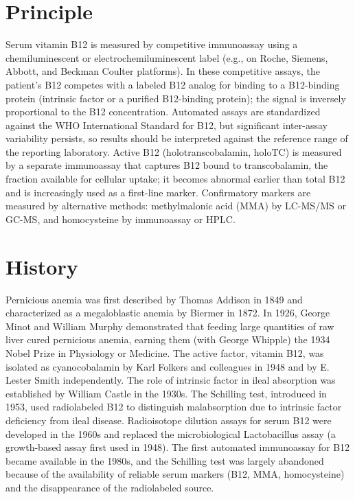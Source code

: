 \section*{Principle}
Serum vitamin B12 is measured by competitive immunoassay using a chemiluminescent or electrochemiluminescent label (e.g., on Roche, Siemens, Abbott, and Beckman Coulter platforms). In these competitive assays, the patient's B12 competes with a labeled B12 analog for binding to a B12-binding protein (intrinsic factor or a purified B12-binding protein); the signal is inversely proportional to the B12 concentration. Automated assays are standardized against the WHO International Standard for B12, but significant inter-assay variability persists, so results should be interpreted against the reference range of the reporting laboratory. Active B12 (holotranscobalamin, holoTC) is measured by a separate immunoassay that captures B12 bound to transcobalamin, the fraction available for cellular uptake; it becomes abnormal earlier than total B12 and is increasingly used as a first-line marker. Confirmatory markers are measured by alternative methods: methylmalonic acid (MMA) by LC-MS/MS or GC-MS, and homocysteine by immunoassay or HPLC.

\section*{History}
Pernicious anemia was first described by Thomas Addison in 1849 and characterized as a megaloblastic anemia by Biermer in 1872. In 1926, George Minot and William Murphy demonstrated that feeding large quantities of raw liver cured pernicious anemia, earning them (with George Whipple) the 1934 Nobel Prize in Physiology or Medicine. The active factor, vitamin B12, was isolated as cyanocobalamin by Karl Folkers and colleagues in 1948 and by E. Lester Smith independently. The role of intrinsic factor in ileal absorption was established by William Castle in the 1930s. The Schilling test, introduced in 1953, used radiolabeled B12 to distinguish malabsorption due to intrinsic factor deficiency from ileal disease. Radioisotope dilution assays for serum B12 were developed in the 1960s and replaced the microbiological Lactobacillus assay (a growth-based assay first used in 1948). The first automated immunoassay for B12 became available in the 1980s, and the Schilling test was largely abandoned because of the availability of reliable serum markers (B12, MMA, homocysteine) and the disappearance of the radiolabeled source.

